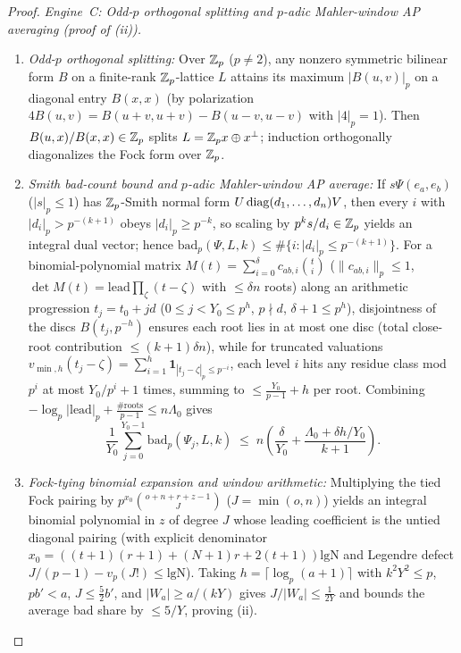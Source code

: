 \begin{proof}
\medskip\noindent
\emph{Engine~C: Odd-$p$ orthogonal splitting and $p$-adic Mahler-window AP averaging (proof of (ii)).}
\begin{enumerate}[label=\textup{\arabic*.}]
\item \emph{Odd-$p$ orthogonal splitting:} Over $\mathbb{Z}_p$ ($p \neq 2$), any nonzero symmetric bilinear form $B$ on a finite-rank $\mathbb{Z}_p$-lattice $L$ attains its maximum $|B(u, v)|_p$ on a diagonal entry $B(x, x)$ (by polarization $4 B(u,v) = B(u+v, u+v) - B(u-v, u-v)$ with $|4|_p = 1$). Then $B(u, x)/B(x, x) \in \mathbb{Z}_p$ splits $L = \mathbb{Z}_p x \oplus x^\perp$; induction orthogonally diagonalizes the Fock form over $\mathbb{Z}_p$.
\item \emph{Smith bad-count bound and $p$-adic Mahler-window AP average:} If $s\Psi(e_a, e_b)$ ($|s|_p \le 1$) has $\mathbb{Z}_p$-Smith normal form $U\operatorname{diag}(d_1, \dots, d_n) V$, then every $i$ with $|d_i|_p > p^{-(k+1)}$ obeys $|d_i|_p \ge p^{-k}$, so scaling by $p^k s / d_i \in \mathbb{Z}_p$ yields an integral dual vector; hence $\mathrm{bad}_p(\Psi, L, k) \le \#\{i : |d_i|_p \le p^{-(k+1)}\}$. For a binomial-polynomial matrix $M(t) = \sum_{i=0}^\delta c_{ab,i}\binom{t}{i}$ ($\|c_{ab,i}\|_p \le 1$, $\det M(t) = \mathrm{lead}\prod_\zeta(t - \zeta)$ with $\le \delta n$ roots) along an arithmetic progression $t_j = t_0 + j d$ ($0 \le j < Y_0 \le p^h$, $p \nmid d$, $\delta + 1 \le p^h$), disjointness of the discs $B(t_j, p^{-h})$ ensures each root lies in at most one disc (total close-root contribution $\le (k+1)\delta n$), while for truncated valuations $v_{\min, h}(t_j - \zeta) = \sum_{i=1}^h \mathbf{1}_{|t_j - \zeta|_p \le p^{-i}}$, each level $i$ hits any residue class mod $p^i$ at most $Y_0 / p^i + 1$ times, summing to $\le \frac{Y_0}{p-1} + h$ per root. Combining $-\log_p|\mathrm{lead}|_p + \frac{\#\text{roots}}{p-1} \le n\Lambda_0$ gives
  \[
    \frac{1}{Y_0}\sum_{j=0}^{Y_0 - 1} \mathrm{bad}_p(\Psi_j, L, k)
    \;\le\; n\!\left(\frac{\delta}{Y_0} + \frac{\Lambda_0 + \delta h / Y_0}{k + 1}\right).
  \]
\item \emph{Fock-tying binomial expansion and window arithmetic:} Multiplying the tied Fock pairing by $p^{x_0}\binom{o+n+r+z-1}{J}$ ($J = \min(o, n)$) yields an integral binomial polynomial in $z$ of degree $J$ whose leading coefficient is the untied diagonal pairing (with explicit denominator $x_0 = ((t+1)(r+1) + (N+1)r + 2(t+1))\mathrm{lgN}$ and Legendre defect $J/(p-1) - v_p(J!) \le \mathrm{lgN}$). Taking $h = \lceil \log_p(a+1)\rceil$ with $k^2 Y^2 \le p$, $p b' < a$, $J \le \frac{5}{2}b'$, and $|W_a| \ge a/(kY)$ gives $J / |W_a| \le \frac{1}{2Y}$ and bounds the average bad share by $\le 5/Y$, proving (ii).
\end{enumerate}


\end{proof}
